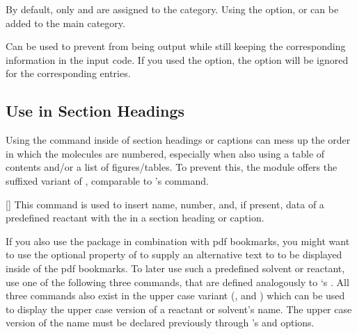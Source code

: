 \documentclass{chemmacros-manual}
\begin{document}
\begin{options}
    By default, only  and  are assigned to the
     category. Using the  option,   or
     can be added to the main category. 
\end{options}
  
\begin{example}
  \par
  \par
\end{example}

\begin{options}
    Can be used to prevent  from being output while still keeping
    the corresponding information in the input code. If you used the
     option, the  option will be
    ignored for the corresponding entries.
\end{options}

\subsection{Use in Section Headings}\label{sec:reactants-in-headings}

Using the  command inside of section headings or captions can
mess up the order in which the molecules are numbered, especially when also
using a table of contents and/or a list of figures/tables. To prevent this,
the  module offers the \code{+} suffixed variant of
, comparable to 's  command.

\begin{commands}
  []
    This command is used to insert name, number, and, if present, data of a
    predefined reactant with the  in a section heading or caption.
\end{commands}

If you also use the  package in combination with \ac{pdf}
bookmarks, you might want to use the optional  property of
 to supply an alternative text to  to be
displayed inside of the \ac{pdf} bookmarks. To later use such a predefined
solvent or reactant, use one of the following three commands, that are defined
analogously to `s . All three commands also exist
in the upper case variant (,  and
) which can be used to display the upper case version of a
reactant or solvent's name. The upper case version of the name must be declared
previously through 's  and
 options.
\end{document}
